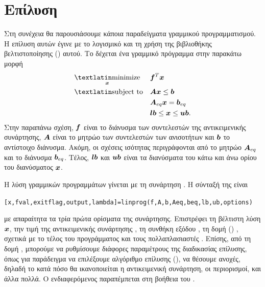 \section{Επίλυση}
Στη συνέχεια θα παρουσιάσουμε κάποια παραδείγματα γραμμικού προγραμματισμού. Η
επίλυση αυτών έγινε με το λογισμικό \href{https://www.mathworks.com/products/matlab/}
{} και τη χρήση της βιβλιοθήκης βελτιστοποίησης () αυτού. Το  δέχεται ένα γραμμικό πρόγραμμα στην παρακάτω μορφή
\begin{equation}\label{eq:lp_mat}
    \begin{aligned}
        & \underset{\vc{x}}{\text{\tl{minimize}}} & & \vc{f}^T \vc{x} \\
        & \text{\tl{subject to}} & & \mt{A} \vc{x} \leq \vc{b} \\
        &&& \mt{A}_{eq} \vc{x} = \vc{b}_{eq} \\
        &&& \vc{lb} \le \vc{x} \le \vc{ub}.
    \end{aligned}
\end{equation}
Στην παραπάνω σχέση, $\bm{f}$ είναι το διάνυσμα των συντελεστών της αντικειμενικής
συνάρτησης, $\boldsymbol{A}$ είναι το μητρώο των συντελεστών των ανισοτήτων και
$\bm{b}$ το αντίστοιχο διάνυσμα. Ακόμη, οι σχέσεις ισότητας περιγράφονται από το
μητρώο $\boldsymbol{A}_{eq}$ και το διάνυσμα $\bm{b}_{eq}$. Τέλος, $\bm{lb}$ και $\bm{ub}$ είναι
τα διανύσματα του κάτω και άνω ορίου του διανύσματος $\bm{x}$.

Η λύση γραμμικών προγραμμάτων γίνεται με τη συνάρτηση
. Η σύνταξή της είναι
\begin{otherlanguage}{english}
    \begin{center}
        \texttt{[x,fval,exitflag,output,lambda]=linprog(f,A,b,Aeq,beq,lb,ub,options)}
    \end{center}
\end{otherlanguage}
με απαραίτητα τα τρία πρώτα ορίσματα της συνάρτησης. Επιστρέφει τη βέλτιστη
λύση $\bm{x}$, την τιμή της αντικειμενικής συνάρτησης , τη συνθήκη
εξόδου , τη δομή () , σχετικά με
το τέλος του  προγράμματος και τους πολλαπλασιαστές 
. Επίσης, από τη δομή , μπορούμε να ρυθμίσουμε
διάφορες παραμέτρους της διαδικασίας επίλυσης, όπως για παράδειγμα να επιλέξουμε
αλγόριθμο επίλυσης (), να θέσουμε ανοχές, δηλαδή το
κατά πόσο θα ικανοποιείται η αντικειμενική συνάρτηση, οι περιορισμοί, και άλλα πολλά.
Ο ενδιαφερόμενος παραπέμπεται στη βοήθεια του .

